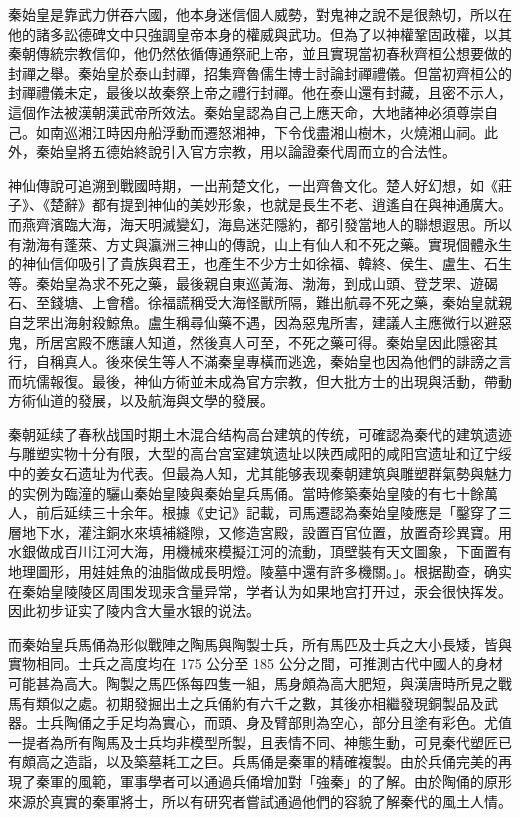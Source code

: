 秦始皇是靠武力併吞六國，他本身迷信個人威勢，對鬼神之說不是很熱切，所以在他的諸多訟德碑文中只強調皇帝本身的權威與武功。但為了以神權鞏固政權，以其秦朝傳統宗教信仰，他仍然依循傳通祭祀上帝，並且實現當初春秋齊桓公想要做的封禪之舉。秦始皇於泰山封禪，招集齊魯儒生博士討論封禪禮儀。但當初齊桓公的封禪禮儀未定，最後以故秦祭上帝之禮行封禪。他在泰山還有封藏，且密不示人，這個作法被漢朝漢武帝所效法。秦始皇認為自己上應天命，大地諸神必須尊崇自己。如南巡湘江時因舟船浮動而遷怒湘神，下令伐盡湘山樹木，火燒湘山祠。此外，秦始皇將五德始終說引入官方宗教，用以論證秦代周而立的合法性。

神仙傳說可追溯到戰國時期，一出荊楚文化，一出齊魯文化。楚人好幻想，如《莊子》、《楚辭》都有提到神仙的美妙形象，也就是長生不老、逍遙自在與神通廣大。而燕齊濱臨大海，海天明滅變幻，海島迷茫隱約，都引發當地人的聯想遐思。所以有渤海有蓬萊、方丈與瀛洲三神山的傳說，山上有仙人和不死之藥。實現個體永生的神仙信仰吸引了貴族與君王，也產生不少方士如徐福、韓終、侯生、盧生、石生等。秦始皇為求不死之藥，最後親自東巡黃海、渤海，到成山頭、登芝罘、遊碣石、至錢塘、上會稽。徐福謊稱受大海怪獸所隔，難出航尋不死之藥，秦始皇就親自芝罘出海射殺鯨魚。盧生稱尋仙藥不遇，因為惡鬼所害，建議人主應微行以避惡鬼，所居宮殿不應讓人知道，然後真人可至，不死之藥可得。秦始皇因此隱密其行，自稱真人。後來侯生等人不滿秦皇專橫而逃逸，秦始皇也因為他們的誹謗之言而坑儒報復。最後，神仙方術並未成為官方宗教，但大批方士的出現與活動，帶動方術仙道的發展，以及航海與文學的發展。

秦朝延续了春秋战国时期土木混合结构高台建筑的传统，可確認為秦代的建筑遗迹与雕塑实物十分有限，大型的高台宫室建筑遗址以陕西咸阳的咸阳宫遗址和辽宁绥中的姜女石遗址为代表。但最為人知，尤其能够表现秦朝建筑與雕塑群氣勢與魅力的实例为臨潼的驪山秦始皇陵與秦始皇兵馬俑。當時修築秦始皇陵的有七十餘萬人，前后延续三十余年。根據《史记》記載，司馬遷認為秦始皇陵應是「鑿穿了三層地下水，灌注銅水來填補縫隙，又修造宮殿，設置百官位置，放置奇珍異寶。用水銀做成百川江河大海，用機械來模擬江河的流動，頂壁裝有天文圖象，下面置有地理圖形，用娃娃魚的油脂做成長明燈。陵墓中還有許多機關。」。根据勘查，确实在秦始皇陵陵区周围发现汞含量异常，学者认为如果地宫打开过，汞会很快挥发。因此初步证实了陵内含大量水银的说法。

而秦始皇兵馬俑為形似戰陣之陶馬與陶製士兵，所有馬匹及士兵之大小長矮，皆與實物相同。士兵之高度均在 175 公分至 185 公分之間，可推測古代中國人的身材可能甚為高大。陶製之馬匹係每四隻一組，馬身頗為高大肥短，與漢唐時所見之戰馬有類似之處。初期發掘出土之兵俑約有六千之數，其後亦相繼發現銅製品及武器。士兵陶俑之手足均為實心，而頭、身及臂部則為空心，部分且塗有彩色。尤值一提者為所有陶馬及士兵均非模型所製，且表情不同、神態生動，可見秦代塑匠已有頗高之造詣，以及築墓耗工之巨。兵馬俑是秦軍的精確複製。由於兵俑完美的再現了秦軍的風範，軍事學者可以通過兵俑增加對「強秦」的了解。由於陶俑的原形來源於真實的秦軍將士，所以有研究者嘗試通過他們的容貌了解秦代的風土人情。

